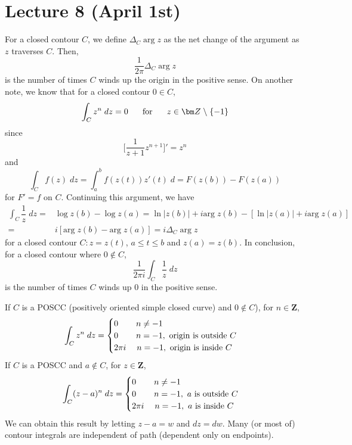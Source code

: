 \section{Lecture 8 (April 1st)}
\begin{defi}
For a closed contour $C$, we define $\Delta _{C}\;\mathrm{arg}\;z$ as the net change of the argument as $z$ traverses $C$. Then,
\[\dfrac{1}{2\pi }\Delta _{C}\;\mathrm{arg}\;z\]
is the number of times $C$ winds up the origin in the positive sense. On another note, we know that for a closed contour $0\in C$,
\[\int _{C}z^{n}\;dz=0\hspace{4ex}\mathrm{for}\hspace{4ex}z\in {\bm Z}\;\backslash\;\{-1\}\]
since
\[\Big[\dfrac{1}{z+1}z^{n+1}\Big]'=z^{n}\]
and
\[\int _{C}f(z)\;dz=\int ^{b}_{a}f(z(t))z'(t)\;d=F(z(b))-F(z(a))\]
for $F'=f$ on $C$. Continuing this argument, we have
\begin{align*}
\int _{C}\dfrac{1}{z}\;dz=&\log z(b)-\log z(a)=\ln |z(b)|+i\mathrm{arg}\;z(b)-[\ln |z(a)|+i\mathrm{arg}\;z(a)]\\=&i[\mathrm{arg}\;z(b)-\mathrm{arg}\;z(a)]=i\Delta _{C}\;\mathrm{arg}\;z
\end{align*}
for a closed contour $C:z=z(t)$, $a\leq t\leq b$ and $z(a)=z(b)$. In conclusion, for a closed contour where $0\notin C$,
\[\dfrac{1}{2\pi i}\int _{C}\dfrac{1}{z}\;dz\]
is the number of times $C$ winds up $0$ in the positive sense.
\end{defi}
\vspace{2ex}
\begin{thm}
If $C$ is a POSCC (positively oriented simple closed curve) and $0\notin C$), for $n\in {\bm Z}$,
\[\int _{C}z^{n}\;dz=\begin{cases}
0\hspace{5ex}n\ne -1\\
0\hspace{5ex}n=-1,\mathrm{\ origin\ is\ outside\ }C\\
2\pi i\hspace{3ex}n=-1,\mathrm{\ origin\ is\ inside\ }C
\end{cases}\]
If $C$ is a POSCC and $a\notin C$, for $z\in {\bm Z}$,
\[\int _{C}(z-a)^{n}\;dz=
\begin{cases}
0\hspace{5ex}n\ne -1\\
0\hspace{5ex}n=-1,\ a\mathrm{\ is\ outside\ }C\\
2\pi i\hspace{3ex}n=-1,\ a\mathrm{\ is\ inside\ }C
\end{cases}
\]
We can obtain this result by letting $z-a=w$ and $dz=dw$. Many (or most of) contour integrals are independent of path (dependent only on endpoints).
\end{thm}
